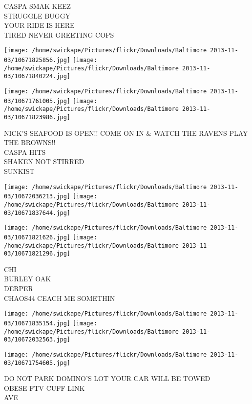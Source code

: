 \documentclass[10pt,letterpaper]{article}
\begin{document}
CASPA SMAK KEEZ\\
STRUGGLE BUGGY\\
YOUR RIDE IS HERE\\
TIRED NEVER GREETING COPS\\
\pagebreak

\texttt{[image: /home/swickape/Pictures/flickr/Downloads/Baltimore 2013-11-03/10671825856.jpg]}
\texttt{[image: /home/swickape/Pictures/flickr/Downloads/Baltimore 2013-11-03/10671840224.jpg]}

\texttt{[image: /home/swickape/Pictures/flickr/Downloads/Baltimore 2013-11-03/10671761005.jpg]}
\texttt{[image: /home/swickape/Pictures/flickr/Downloads/Baltimore 2013-11-03/10671823986.jpg]}

NICK'S SEAFOOD IS OPEN!! COME ON IN \& WATCH THE RAVENS PLAY THE BROWNS!!\\
CASPA HITS\\
SHAKEN NOT STIRRED\\
SUNKIST\\
\pagebreak

\texttt{[image: /home/swickape/Pictures/flickr/Downloads/Baltimore 2013-11-03/10672036213.jpg]}
\texttt{[image: /home/swickape/Pictures/flickr/Downloads/Baltimore 2013-11-03/10671837644.jpg]}

\texttt{[image: /home/swickape/Pictures/flickr/Downloads/Baltimore 2013-11-03/10671821626.jpg]}
\texttt{[image: /home/swickape/Pictures/flickr/Downloads/Baltimore 2013-11-03/10671821296.jpg]}

CHI\\
BURLEY OAK\\
DERPER\\
CHAOS44 CEACH ME SOMETHIN\\
\pagebreak

\texttt{[image: /home/swickape/Pictures/flickr/Downloads/Baltimore 2013-11-03/10671835154.jpg]}
\texttt{[image: /home/swickape/Pictures/flickr/Downloads/Baltimore 2013-11-03/10672032563.jpg]}

\texttt{[image: /home/swickape/Pictures/flickr/Downloads/Baltimore 2013-11-03/10671754605.jpg]}

DO NOT PARK DOMINO'S LOT YOUR CAR WILL BE TOWED\\
OBESE FTV CUFF LINK\\
AVE\\
\pagebreak
\end{document}
